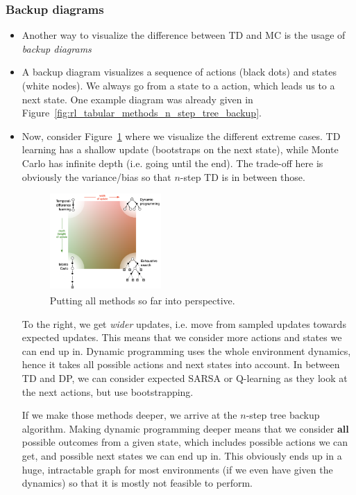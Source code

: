 \subsubsection{Backup diagrams}
\label{sec:value_based_tabular_backup_diagram}
\begin{itemize}
	\item Another way to visualize the difference between TD and MC is the usage of \textit{backup diagrams}
	\item A backup diagram visualizes a sequence of actions (black dots) and states (white nodes). We always go from a state to a action, which leads us to a next state. One example diagram was already given in Figure~\ref{fig:rl_tabular_methods_n_step_tree_backup}.
	\item Now, consider Figure~\ref{fig:rl_tabular_methods_final_comparison} where we visualize the different extreme cases. TD learning has a shallow update (bootstraps on the next state), while Monte Carlo has infinite depth (i.e. going until the end). The trade-off here is obviously the variance/bias so that $n$-step TD is in between those.
	
	\begin{figure}[ht!]
		\centering
		\includegraphics[width=0.4\textwidth]{figures/rl_tabular_methods_final_comparison.png}
		\caption{Putting all methods so far into perspective.}
		\label{fig:rl_tabular_methods_final_comparison}
	\end{figure}
	
	To the right, we get \textit{wider} updates, i.e. move from sampled updates towards expected updates. This means that we consider more actions and states we can end up in. Dynamic programming uses the whole environment dynamics, hence it takes all possible actions and next states into account. In between TD and DP, we can consider expected SARSA or Q-learning as they look at the next actions, but use bootstrapping. 
	
	If we make those methods deeper, we arrive at the $n$-step tree backup algorithm. Making dynamic programming deeper means that we consider \textbf{all} possible outcomes from a given state, which includes possible actions we can get, and possible next states we can end up in. This obviously ends up in a huge, intractable graph for most environments (if we even have given the dynamics) so that it is mostly not feasible to perform.
\end{itemize}

